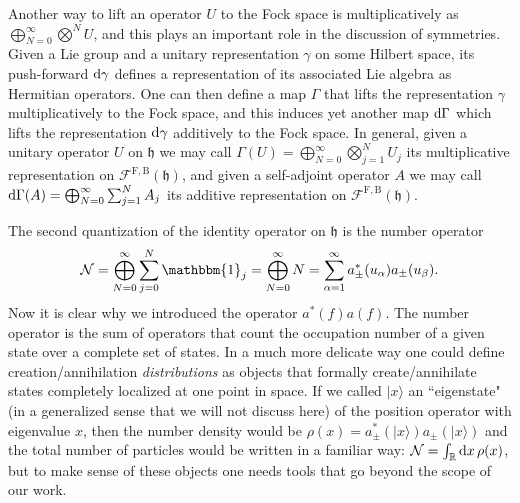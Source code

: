 \begin{remark}
	Another way to lift an operator $U$ to the Fock space is multiplicatively as
	$\bigoplus_{N=0}^\infty\bigotimes^N U$, and this plays an important role in the discussion
	of symmetries. Given a Lie group and a unitary representation $\gamma$ on some Hilbert
	space, its push-forward $\mathrm{d} \gamma$ defines a representation of its associated Lie
	algebra as Hermitian operators. One can then define a map $\Gamma$ that lifts the
	representation $\gamma$ multiplicatively to the Fock space, and this induces yet another
	map $\mathrm{d}\Gamma$ which lifts the representation $\mathrm{d}\gamma$ additively to the Fock space.
	In general, given a unitary operator $U$ on $\mathfrak{h}$ we may call $\Gamma(U)=
	\bigoplus_{N=0}^\infty\bigotimes_{j=1}^N U_j$ its multiplicative representation on
	$\mathcal{F}^{\mathrm{F,B}}(\mathfrak{h})$, and given a self-adjoint operator $A$ we may
	call $\mathrm{d}\Gamma(A)= \bigoplus_{N=0}^\infty\sum_{j=1}^N A_j$ its additive representation on
	$\mathcal{F}^{\mathrm{F,B}}(\mathfrak{h})$.
\end{remark}

\begin{remark}
	The second quantization of the identity operator on $\mathfrak{h}$ is the number operator
	\begin{align*}
		\mathcal{N} = \bigoplus_{N=0}^\infty\sum_{j=0}^N\mathbbm{1}_j = \bigoplus_{N=0}^\infty N
		= \sum_{\alpha=1}^\infty a^*_\pm(u_\alpha) a_\pm(u_\beta).
	\end{align*}
	Now it is clear why we introduced the operator $a^*(f)a(f)$. The number operator is the
	sum of operators that count the occupation number of a given state over a complete set of
	states. In a much more delicate way one could define creation/annihilation
	\textit{distributions} as objects that formally create/annihilate states completely
	localized at one point in space. If we called $|x\rangle$ an ``eigenstate" (in a
	generalized sense that we will not discuss here) of the position operator with eigenvalue
	$x$, then the number density would be $\rho(x)=a^*_\pm(|x\rangle)a_\pm(|x\rangle)$ and the
	total number of particles would be written in a familiar way: $\mathcal{N} =
	\int_{\mathbb{R}} \mathrm{d} x\,\rho(x)$, but to make sense of these objects one needs tools that
	go beyond the scope of our work.
\end{remark}

